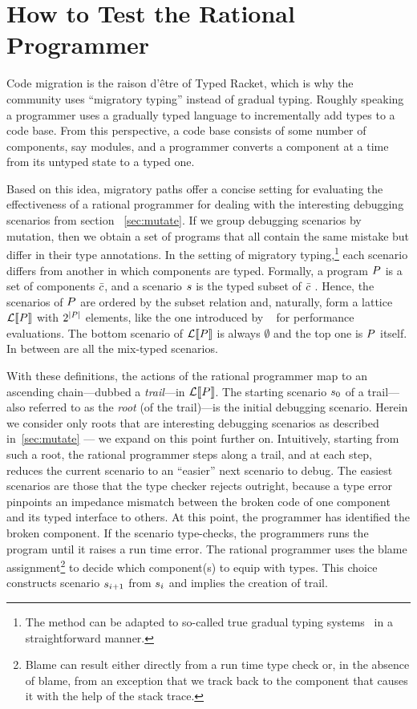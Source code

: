 \section{How to Test the Rational Programmer} 

Code migration is the raison d'\^etre of Typed Racket, which is why the community
uses ``migratory typing'' instead of gradual typing. Roughly speaking a
programmer uses a gradually typed language to incrementally add types to a code
base. From this perspective, a code base consists of some number of components,
say modules, and a programmer converts a component at a time from its untyped
state to a typed one. 

Based on this idea, migratory paths offer a concise setting for
evaluating the effectiveness of a rational programmer for dealing with the
interesting debugging scenarios  from section ~\ref{sec:mutate}.
If we group debugging scenarios by mutation, then we obtain a set 
of programs that all contain the same mistake but differ in their type
annotations.  In the setting of migratory typing,\footnote{The method can be adapted to
so-called true gradual typing systems~\cite{svcb-snapl-2015} in a
straightforward manner.} each scenario differs from another in which
components are typed. Formally, a program $P$ is a set of
components $\bar{c}$, and a scenario $s$ is the typed subset of
$\bar{c}$ . Hence, the scenarios of $P$ are ordered by the
subset relation and, naturally,  form a lattice $\mathcal{L}\llbracket P\rrbracket$ with
$2^{\mid P \mid}$ elements, like
the one introduced by ~\citet{tfgnvf-popl-2016} for performance
evaluations. The bottom scenario of
$\mathcal{L}\llbracket P\rrbracket$ is always $\emptyset$ and the top one is $P$
itself. In between are all the mix-typed scenarios.


With these definitions, the actions of the rational programmer map to an
ascending chain---dubbed a \emph{trail}---in $\mathcal{L}\llbracket P\rrbracket$.  The
starting scenario $s_0$ of a trail---also referred to as the
\emph{root} (of the trail)---is the initial debugging scenario.  Herein we
consider only roots that are interesting debugging scenarios as described
in~\ref{sec:mutate} --- we expand on this point further on.  Intuitively,
starting from such a root, the rational programmer  steps along a trail,
and at each step, reduces the current scenario to an ``easier'' next
scenario to debug.  The easiest scenarios are those that the type checker
rejects outright, because a type error pinpoints an impedance mismatch
between the broken code of one component and its typed interface to
others. At this point, the programmer has identified the broken component.
If the scenario type-checks, the programmers runs the program until it
raises a run time error.  The rational programmer uses the blame
assignment\footnote{Blame can result either directly from a run time type
check or, in the absence of blame, from an exception that we track back to
the component that causes it with the help of the stack trace.} to decide
which component(s) to equip with types. This choice constructs scenario
$s_{i+1}$ from $s_{i}$ and implies the creation of trail.  

